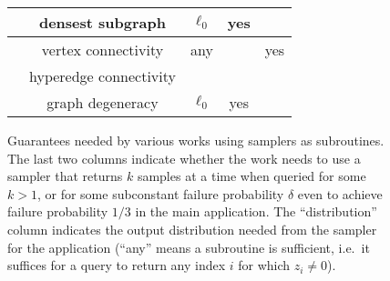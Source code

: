 \begin{figure}
\begin{center}
\begin{tabular}{|c|c|c|c|c|}
\hline
\cite{EsfandiariHW16} & densest subgraph & $\ell_0$ & yes & \\
\hline
\cite{GuhaMT15} & vertex connectivity & any & & yes\\
 & hyperedge connectivity &  & & \\
\hline
\cite{FarachColtonT16} & graph degeneracy & $\ell_0$ & yes & \\
\hline
\end{tabular}
\caption{Guarantees needed by various works using samplers as subroutines. The last two columns indicate whether the work needs to use a sampler that returns $k$ samples at a time when queried for some $k>1$, or for some subconstant failure probability $\delta$ even to achieve failure probability $1/3$ in the main application. The ``distribution'' column indicates the output distribution needed from the sampler for the application (``any'' means a \suppfind{} subroutine is sufficient, i.e.\ it suffices for a query to return any index $i$ for which $z_i\neq 0$).}\label{fig:table}
\end{center}
\end{figure}



